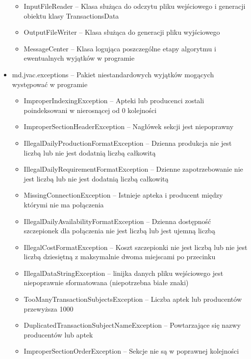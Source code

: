 \documentclass[]{article}
\begin{document}
\begin{itemize}
        \begin{itemize}
            \item
            InputFileReader -- Klasa służąca do odczytu pliku wejściowego i
            generacji obiektu klasy TransactionsData
            \item
            OutputFileWriter -- Klasa służąca do generacji pliku wyjściowego
            \item
            MessageCenter -- Klasa logująca poszczególne etapy algorytmu i
            ewentualnych wyjątków w programie
        \end{itemize}
        \item
        md.jvac.exceptions -- Pakiet niestandardowych wyjątków mogących
        występować w programie

        \begin{itemize}
            \item
            ImproperIndexingException -- Apteki lub producenci zostali
            poindeksowani w nierosnącej od 0 kolejności
            \item
            ImproperSectionHeaderException -- Nagłówek sekcji jest niepoprawny
            \item
            IllegalDailyProductionFormatException -- Dzienna produkcja nie jest
            liczbą lub nie jest dodatnią liczbą całkowitą
            \item
            IllegalDailyRequirementFormatException -- Dzienne zapotrzebowanie
            nie jest liczbą lub nie jest dodatnią liczbą całkowitą
            \item
            MissingConnectionException -- Istnieje apteka i producent między
            którymi nie ma połączenia
            \item
            IllegalDailyAvailabilityFormatException -- Dzienna dostępność
            szczepionek dla połączenia nie jest liczbą lub jest ujemną liczbą
            \item
            IllegalCostFormatException -- Koszt szczepionki nie jest liczbą lub
            nie jest liczbą dziesiętną z maksymalnie dwoma miejscami po
            przecinku
            \item
            IllegalDataStringException -- linijka danych pliku wejściowego jest
            niepoprawnie sformatowana (niepotrzebna białe znaki)
            \item
            TooManyTransactionSubjectsException -- Liczba aptek lub producentów
            przewyższa 1000
            \item
            DuplicatedTransactionSubjectNameException -- Powtarzające się nazwy
            producentów lub aptek
            \item
            ImproperSectionOrderException -- Sekcje nie są w poprawnej
            kolejności
        \end{itemize}
    \end{itemize}
\end{document}

